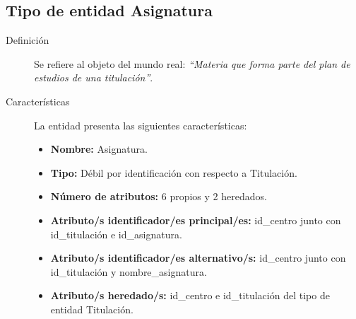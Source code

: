 \subsection{Tipo de entidad Asignatura}

   \begin{description}

   \item[Definición] Se refiere al objeto del mundo real: \emph{``Materia que
   forma parte del plan de estudios de una titulación''}.

   \item[Características] La entidad presenta las siguientes características:
      \begin{itemize}
         \item \textbf{Nombre:} Asignatura.
         \item \textbf{Tipo:} Débil por identificación con respecto a Titulación.
         \item \textbf{Número de atributos:} 6 propios y 2 heredados.
         \item \textbf{Atributo/s identificador/es principal/es:} id\_centro junto con \\id\_titulación e id\_asignatura.
         \item \textbf{Atributo/s identificador/es alternativo/s:} id\_centro junto con \\id\_titulación y nombre\_asignatura.
         \item \textbf{Atributo/s heredado/s:} id\_centro e id\_titulación del
         tipo de entidad Titulación.
      \end{itemize}


\end{description}
